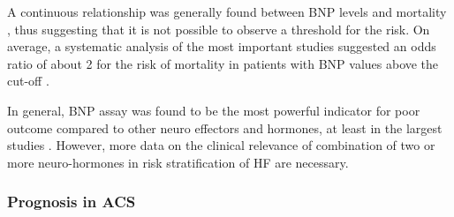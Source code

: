 \documentclass[14pt,a4paper,onecolumn]{extarticle}
\begin{document}

A continuous relationship was generally found between BNP levels and mortality \citep{bib3194}, thus suggesting that it is not possible to observe a threshold for the risk. On average, a systematic analysis of the most important studies suggested an odds ratio of about 2 for the risk of mortality in patients with BNP values above the cut-off \citep{bib35}.







In general, BNP assay was found to be the most powerful indicator for poor outcome compared to other neuro effectors and hormones, at least in the largest studies \citep{bib35} \citep{bib3204} \citep{bib3206}. However, more data on the clinical relevance of combination of two or more neuro-hormones in risk stratification of HF are necessary.



\subsubsection{ Prognosis in ACS}
\end{document}
